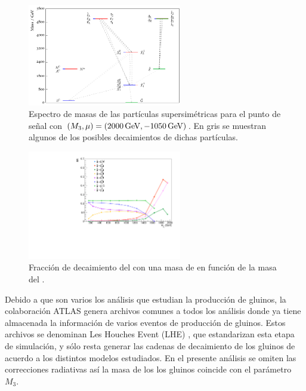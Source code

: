 \begin{figure}
  \centering
  \includegraphics[width=0.6\textwidth]{images/analysis/phb_mass_spectrum.pdf}
  \caption{Espectro de masas de las partículas supersimétricas para el punto de señal con $(M_3, \mu) = (2000\,\text{GeV}, -1050\,\text{GeV})$. En gris se muestran algunos de los posibles decaimientos de dichas partículas.}
  \label{fig:mass_spec}
\end{figure}

\begin{figure}
  \centering
  \includegraphics[width=0.6\textwidth]{images/analysis/phb_go_br.pdf}
  \caption{Fracción de decaimiento del \gluino con una masa de  en función de la masa del \ninoone.}
  \label{fig:gluino_decays}
\end{figure}



Debido a que son varios los análisis que estudian la producción de gluinos, la colaboración ATLAS genera archivos comunes a todos los análisis donde ya tiene almacenada la información de varios eventos de producción de gluinos. Estos archivos se denominan Les Houches Event (LHE) \cite{Alwall:2006yp}, que estandarizan esta etapa de simulación, y sólo resta generar las cadenas de decaimiento de los gluinos de acuerdo a los distintos modelos estudiados. En el presente análisis se omiten las correcciones radiativas así la masa de los los gluinos coincide con el parámetro $M_3$.

